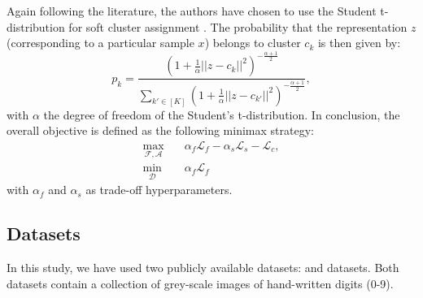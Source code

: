 Again following the literature, the authors have chosen to use the Student t-distribution for soft cluster assignment \citep{Li_2020_CVPR}. The probability that the representation $z$ (corresponding to a particular sample $x$) belongs to cluster $c_k$ is then given by:
\begin{equation}
    p_k = \frac{(1+\frac{1}{\alpha}||z-c_k||^2)^{-\frac{\alpha+1}{2}}}{\sum_{k'\in [K]}(1+\frac{1}{\alpha}||z-c_{k'}||^2)^{-\frac{\alpha+1}{2}}},
    \label{eq:student-t}
\end{equation}
with $\alpha$ the degree of freedom of the Student's t-distribution. In conclusion, the overall objective is defined as the following minimax strategy:
\begin{align}
    \max_{\mathcal{F}, \mathcal{A}}\quad& \alpha_f \mathcal{L}_f -\alpha_s \mathcal{L}_s-\mathcal{L}_c,\\
    \min_{\mathcal{D}}\quad& \alpha_f\mathcal{L}_f
    \label{eq:objective}
\end{align}
with $\alpha_f$ and $\alpha_s$ as trade-off hyperparameters.








\subsection{Datasets}

In this study, we have used two publicly available datasets:  \revMNIST and \USPSMNIST datasets. Both datasets contain a collection of grey-scale images of hand-written digits (0-9). 

